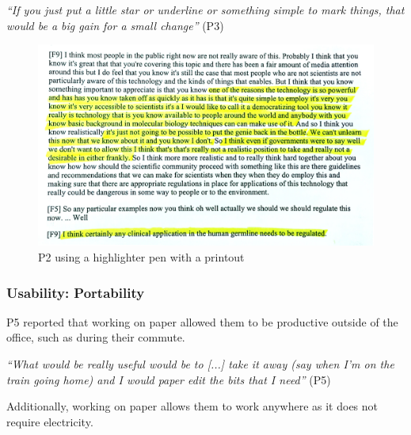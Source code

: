 \textit{``If you just put a little star or underline or something simple to
  mark things, that would be a big gain for a small change''} (P3)




\begin{figure}[t]
\centering
  \includegraphics[width=\columnwidth]{figs/highlighting-cropped.jpg}
  \caption{P2 using a highlighter pen with a printout}
  \label{fig:highlight}
\end{figure}

\subsubsection{Usability: Portability}

P5 reported that working on paper allowed them to be productive outside of
the office, such as during their commute.

\textit{``What would be really useful would be to [...] take it away (say when
  I'm on the train going home) and I would paper edit the bits that I need''}
(P5)

Additionally, working on paper allows them to work anywhere as it does not
require electricity.

